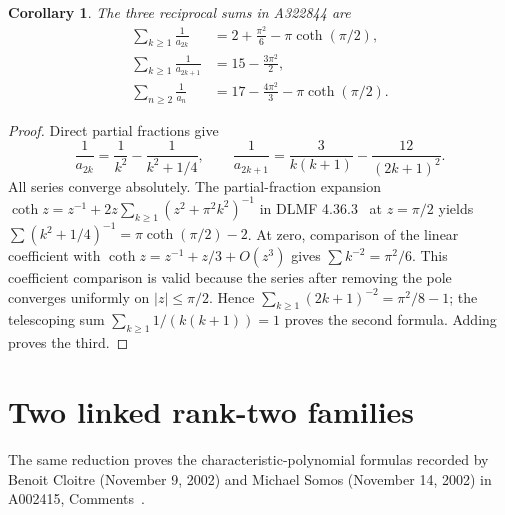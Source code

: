 \documentclass[11pt]{article}
\newtheorem{corollary}[theorem]{Corollary}
\begin{document}
\begin{corollary}\label{cor:reciprocal}
The three reciprocal sums in A322844 are
\begin{align*}
\sum_{k\geq1}\frac1{a_{2k}}&=2+\frac{\pi^2}{6}-\pi\coth(\pi/2),\\
\sum_{k\geq1}\frac1{a_{2k+1}}&=15-\frac{3\pi^2}{2},\\
\sum_{n\geq2}\frac1{a_n}&=17-\frac{4\pi^2}{3}-\pi\coth(\pi/2).
\end{align*}
\end{corollary}
\begin{proof}
Direct partial fractions give
\[
\frac1{a_{2k}}=\frac1{k^2}-\frac1{k^2+1/4},\qquad
\frac1{a_{2k+1}}=\frac3{k(k+1)}-\frac{12}{(2k+1)^2}.
\]
All series converge absolutely. The partial-fraction expansion
$\coth z=z^{-1}+2z\sum_{k\geq1}(z^2+\pi^2k^2)^{-1}$
in DLMF 4.36.3~\cite{dlmf} at $z=\pi/2$ yields
$\sum(k^2+1/4)^{-1}=\pi\coth(\pi/2)-2$.
At zero, comparison of the linear coefficient with
$\coth z=z^{-1}+z/3+O(z^3)$ gives $\sum k^{-2}=\pi^2/6$.
This coefficient comparison is valid because the series after removing
the pole converges uniformly on $|z|\leq\pi/2$.
Hence $\sum_{k\geq1}(2k+1)^{-2}=\pi^2/8-1$;
the telescoping sum $\sum_{k\geq1}1/(k(k+1))=1$ proves the second
formula. Adding proves the third.
\end{proof}

\section{Two linked rank-two families}
The same reduction proves the characteristic-polynomial formulas recorded
by Benoit Cloitre (November 9, 2002) and Michael Somos (November 14, 2002)
in A002415, Comments~\cite{s002415}.
\end{document}
